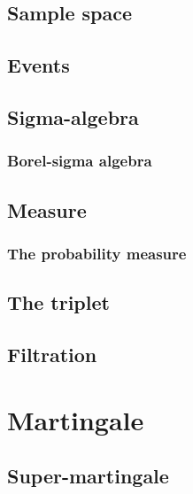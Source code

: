 \subsection{Sample space}



\subsection{Events}



\subsection{Sigma-algebra}



\subsubsection{Borel-sigma algebra}



\subsection{Measure}



\subsubsection{The probability measure}



\subsection{The triplet}



\subsection{Filtration}



\section{Martingale}



\subsection{Super-martingale}



